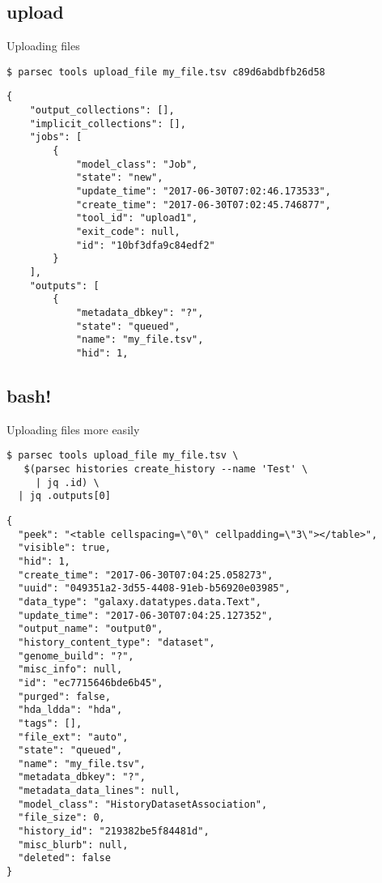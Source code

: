 \documentclass[12pt]{phage3slides} %
\begin{document}
\subsection{upload}
\begin{frame}[fragile,t]{Uploading files}
\begin{verbatim}
$ parsec tools upload_file my_file.tsv c89d6abdbfb26d58
\end{verbatim}
\begin{verbatim}
{
    "output_collections": [],
    "implicit_collections": [],
    "jobs": [
        {
            "model_class": "Job",
            "state": "new",
            "update_time": "2017-06-30T07:02:46.173533",
            "create_time": "2017-06-30T07:02:45.746877",
            "tool_id": "upload1",
            "exit_code": null,
            "id": "10bf3dfa9c84edf2"
        }
    ],
    "outputs": [
        {
            "metadata_dbkey": "?",
            "state": "queued",
            "name": "my_file.tsv",
            "hid": 1,
\end{verbatim}
\end{frame}



\subsection{bash!}
\begin{frame}[fragile,t]{Uploading files more easily}
\begin{verbatim}
$ parsec tools upload_file my_file.tsv \
   $(parsec histories create_history --name 'Test' \
     | jq .id) \
  | jq .outputs[0]
\end{verbatim}
\begin{verbatim}
{
  "peek": "<table cellspacing=\"0\" cellpadding=\"3\"></table>",
  "visible": true,
  "hid": 1,
  "create_time": "2017-06-30T07:04:25.058273",
  "uuid": "049351a2-3d55-4408-91eb-b56920e03985",
  "data_type": "galaxy.datatypes.data.Text",
  "update_time": "2017-06-30T07:04:25.127352",
  "output_name": "output0",
  "history_content_type": "dataset",
  "genome_build": "?",
  "misc_info": null,
  "id": "ec7715646bde6b45",
  "purged": false,
  "hda_ldda": "hda",
  "tags": [],
  "file_ext": "auto",
  "state": "queued",
  "name": "my_file.tsv",
  "metadata_dbkey": "?",
  "metadata_data_lines": null,
  "model_class": "HistoryDatasetAssociation",
  "file_size": 0,
  "history_id": "219382be5f84481d",
  "misc_blurb": null,
  "deleted": false
}
\end{verbatim}
\end{frame}
\end{document}

